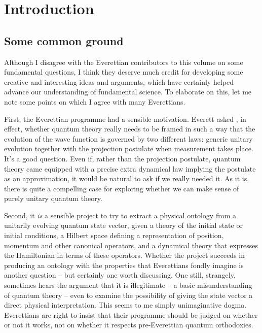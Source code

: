 \documentclass[aps,
pra,epsfig,12pt,nofootinbib]{revtex4}
\begin{document}
\section{Introduction}

\subsection{Some common ground}

Although I disagree with the
Everettian contributors to this volume on some fundamental questions, 
I think they deserve much credit for developing some creative
and interesting ideas and arguments, which have
certainly helped advance our understanding of fundamental science. 
To elaborate on this, let me note some points on which I
agree with many Everettians.   

First, the Everettian programme had a sensible motivation.  Everett
asked \cite{everettone}, in effect, whether 
quantum theory really needs to be framed
in such a way that the evolution of the wave function is governed
by two different laws: generic unitary evolution together with the
projection postulate when measurement takes place.  
It's a good question.  Even if, rather than the projection postulate, 
quantum theory came equipped with a precise extra dynamical law
implying the postulate as an approximation, it would be natural to ask
if we really needed it.  As it is, there 
is quite a compelling case for exploring
whether we can make sense of purely unitary quantum theory.

Second, it {\it is} a sensible project to try to extract a physical
ontology from a unitarily evolving quantum state vector, given a
theory of the initial state or initial conditions, a Hilbert space
defining a representation of position, momentum and other canonical
operators, and a dynamical theory that expresses the Hamiltonian in
terms of these operators.  Whether the project succeeds
in producing an ontology with the properties that Everettians
fondly imagine is another question -- but certainly one worth discussing. 
One still, strangely, sometimes hears the argument that it is
illegitimate -- a basic misunderstanding of quantum theory -- even to
examine the possibility of giving the state vector a direct physical
interpretation.  This seems to me simply unimaginative dogma.
Everettians are right to insist that their programme 
should be judged on whether or not it works, not on whether it respects 
pre-Everettian quantum orthodoxies.
\end{document}
